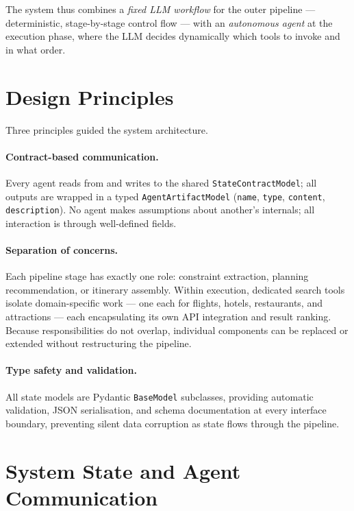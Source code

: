 \documentclass[a4paper,oneside,bibliography=totoc]{scrbook}
\begin{document}
The system thus combines a \emph{fixed LLM workflow} for the outer pipeline
--- deterministic, stage-by-stage control flow --- with an \emph{autonomous
agent} at the execution phase, where the LLM decides dynamically which tools
to invoke and in what order.



\section{Design Principles}
\label{sec:system:principles}
Three principles guided the system architecture.

\paragraph{Contract-based communication.}
Every agent reads from and writes to the shared \texttt{StateContractModel};
all outputs are wrapped in a typed \texttt{AgentArtifactModel}
(\texttt{name}, \texttt{type}, \texttt{content}, \texttt{description}).
No agent makes assumptions about another's internals; all interaction is
through well-defined fields.

\paragraph{Separation of concerns.}
Each pipeline stage has exactly one role: constraint extraction, planning
recommendation, or itinerary assembly. Within execution, dedicated search
tools isolate domain-specific work --- one each for flights, hotels,
restaurants, and attractions --- each encapsulating its own API integration
and result ranking. Because responsibilities do not overlap, individual
components can be replaced or extended without restructuring the pipeline.

\paragraph{Type safety and validation.}
All state models are Pydantic \texttt{BaseModel} subclasses, providing
automatic validation, JSON serialisation, and schema documentation at every
interface boundary, preventing silent data corruption as state flows through
the pipeline.


\section{System State and Agent Communication}
\label{sec:system:state}
\end{document}
